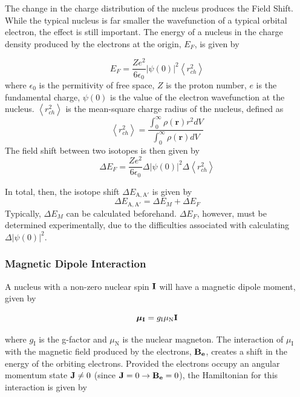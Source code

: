 The change in the charge distribution of the nucleus produces the Field Shift. While the typical nucleus is far smaller the wavefunction of a typical orbital electron, the effect is still important. The energy of a nucleus in the charge density produced by the electrons at the origin, $E_F$, is given by

\begin{equation}
E_F = \frac{Ze^2}{6 \epsilon_0}|\psi(0)|^2 \left\langle r_{ch}^2\right\rangle
\end{equation}
where $\epsilon_0$ is the permitivity of free space, $Z$ is the proton number, $e$ is the fundamental charge, $\psi(0)$ is the value of the electron wavefunction at the nucleus. $ \left\langle r_{ch}^2\right\rangle$ is the mean-square charge radius of the nucleus, defined as
\begin{equation}
 \left\langle r_{ch}^2\right\rangle = \frac{\int_0^{\infty}\rho(\mathbf{r})r^2dV}{\int_0^{\infty}\rho(\mathbf{r})dV}
\end{equation}
\noindent The field shift between two isotopes is then given by
\begin{equation}
\Delta E_F =  \frac{Ze^2}{6 \epsilon_0}\Delta|\psi(0)|^2 \Delta\left\langle r_{ch}^2\right\rangle
\end{equation}

\noindent In total, then, the isotope shift $\Delta E_{\mathrm{A,A}'}$ is given by
\begin{equation}
 \Delta E_{\mathrm{A,A'}} = \Delta E_M + \Delta E_F
\end{equation}
\noindent Typically, $\Delta E_M$ can be calculated beforehand. $ \Delta E_F$, however, must be determined experimentally, due to the difficulties associated with calculating $\Delta|\psi(0)|^2$.
\noindent \subsubsection{Magnetic Dipole Interaction}
A nucleus with a non-zero nuclear spin $\bf{I}$  will have a magnetic dipole moment, given by

\begin{equation}
\boldsymbol{\mu}_{\mathrm{\bf{I}}} = g_{\mathrm{I}}\mu_{\mathrm{N}}\mathrm{\bf{I}}
\end{equation}

\noindent where $g_{\mathrm{I}}$ is the g-factor and $\mu_{\mathrm{N}}$ is the nuclear magneton.\cite{Nut} The interaction of $\mu_{\mathrm{I}}$ with the magnetic field produced by the electrons, $\mathrm{\bf{B_e}}$, creates a shift in the energy of the orbiting electrons. Provided the electrons occupy an angular momentum state $\mathrm{\bf{J}} \neq 0$ (since $\mathrm{\bf{J}} = 0 \rightarrow \mathrm{\bf{B_e}} = 0$), the Hamiltonian for this interaction is given by

